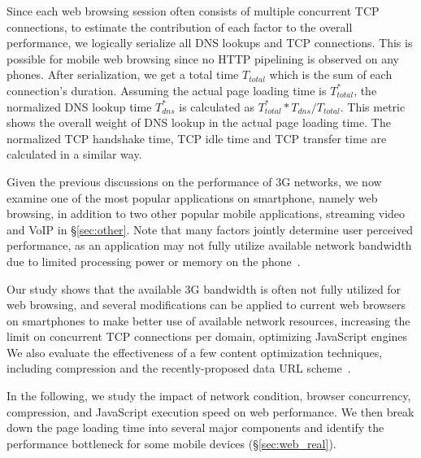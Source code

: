 
Since each web browsing session often consists of multiple concurrent
TCP connections, to estimate the contribution of each factor to the 
overall performance, we logically serialize all DNS lookups and TCP 
connections. This is possible for mobile web browsing since no HTTP 
pipelining is observed on any phones. After serialization, we get a 
total time $T_{total}$ which is the sum of each connection's duration. 
Assuming the actual page loading time is $T^{*}_{total}$, the
normalized DNS lookup time $T^{*}_{dns}$ is calculated as
$T^{*}_{total} * T_{dns} / T_{total}$. This metric shows the 
overall weight of DNS lookup in the actual page loading time. The
normalized TCP handshake time, TCP idle time and TCP transfer time 
are calculated in a similar way. 



\label{sec:web}

Given the previous discussions on the performance of 3G networks, we 
now examine one of the most popular applications on smartphone, 
namely web browsing, in addition to two other popular mobile 
applications, streaming video and VoIP in \S\ref{sec:other}. Note 
that many factors jointly determine user perceived performance, as 
an application may not fully utilize available network bandwidth due 
to limited processing power or memory on the 
phone~\cite{Zhuang:A3:Mobicom2006}.

Our study shows that the available 3G bandwidth is often not fully
utilized for web browsing, and several modifications can be applied 
to current web browsers on smartphones to make better use of
available network resources, \eg increasing the limit on concurrent
TCP connections per domain, optimizing JavaScript engines \etc We 
also evaluate the effectiveness of a few content optimization 
techniques, including compression and the recently-proposed data 
URL scheme~\cite{rfc2397}.

In the following, we study the impact of network condition, browser
concurrency, compression, and JavaScript execution speed on web 
performance. We then break down the page loading time into several 
major components and identify the performance bottleneck for some 
mobile devices (\S\ref{sec:web_real}).

